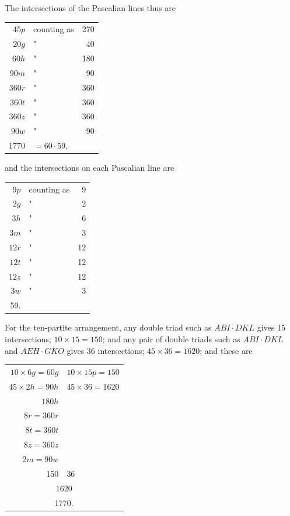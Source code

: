 \documentclass[11pt,a4paper]{article}
\theoremstyle{definition}
\begin{document}
The intersections of the Pascalian lines thus are
\begin{center}
\begin{tabular}{r@{\ }l@{\ }r}
$45p$ & counting as & 270\\
$20g$ & " & 40\\
$60h$ & " & 180\\
$90m$ & " & 90\\
$360r$ & " & 360\\
$360t$ & " & 360\\
$360z$ & " & 360\\
$90w$ & " & 90\\
\hline
1770 & $= 60 \cdot 59$,
\end{tabular}
\end{center}
and the intersections on each Pascalian line are
\begin{center}
\begin{tabular}{r@{\ }l@{\ }r}
$9p$ & counting as & 9\\
$2g$ & " & 2\\
$3h$ & " & 6\\
$3m$ & " & 3\\
$12r$ & " & 12\\
$12t$ & " & 12\\
$12z$ & " & 12\\
$3w$ & " & 3\\
\hline
59.
\end{tabular}
\end{center}

\newpage

For the ten-partite arrangement, any double triad such as $ABI \cdot DKL$ gives 15 intersections; $10 \times 15 = 150$; and any pair of double triads such as $ABI \cdot DKL$ and $AEH \cdot GKO$ gives 36 intersections; $45 \times 36 = 1620$; and these are
\begin{center}
\begin{tabular}{r@{\ }l}
$10 \times 6g = 60g$ & $10 \times 15p = 150$\\
$45 \times 2h = 90h$ & $45 \times 36 = 1620$\\
$180h$ & \\
$8r = 360r$ & \\
$8t = 360t$ & \\
$8z = 360z$ & \\
$2m = 90w$ & \\
\hline
150 & 36\\
\multicolumn{2}{c}{1620}\\
\multicolumn{2}{c}{1770.}
\end{tabular}
\end{center}
\end{document}
